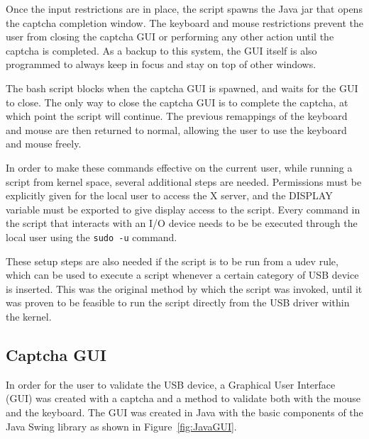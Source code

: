 \documentclass[pagenumbers]{ieee}
\begin{document}
Once the input restrictions are in place, the script spawns the Java jar that opens the captcha completion window. The keyboard and mouse restrictions prevent the user from closing the captcha GUI or performing any other action until the captcha is completed. As a backup to this system, the GUI itself is also programmed to always keep in focus and stay on top of other windows.

The bash script blocks when the captcha GUI is spawned, and waits for the GUI to close. The only way to close the captcha GUI is to complete the captcha, at which point the script will continue. The previous remappings of the keyboard and mouse are then returned to normal, allowing the user to use the keyboard and mouse freely.

In order to make these commands effective on the current user, while running a script from kernel space, several additional steps are needed. Permissions must be explicitly given for the local user to access the X server, and the DISPLAY variable must be exported to give display access to the script.  Every command in the script that interacts with an I/O device needs to be be executed through the local user using the \texttt{sudo -u} command. 

These setup steps are also needed if the script is to be run from a udev rule, which can be used to execute a script whenever a certain category of USB device is inserted. This was the original method by which the script was invoked, until it was proven to be feasible to run the script directly from the USB driver within the kernel.


\subsection{Captcha GUI}
\label{section:gui}

In order for the user to validate the USB device, a Graphical User Interface (GUI) was created with a captcha and a method to validate both with the mouse and the keyboard. The GUI was created in Java with the basic components of the Java Swing \cite{kim} library as shown in Figure~\ref{fig:JavaGUI}.
\end{document}

